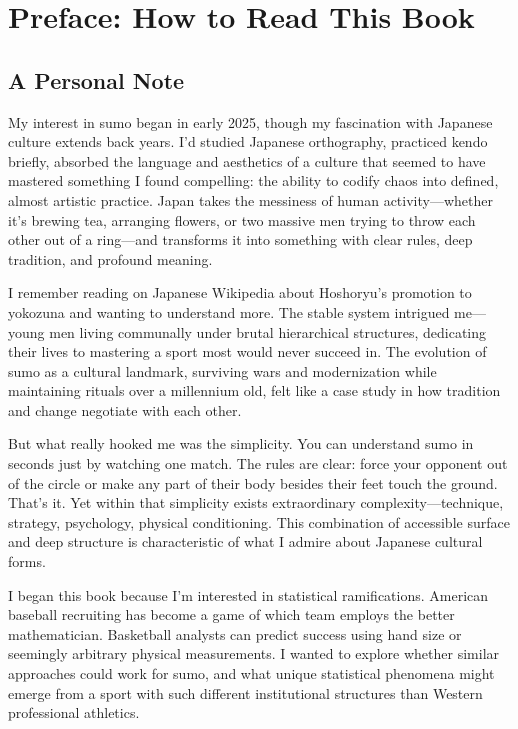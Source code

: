 \chapter*{Preface: How to Read This Book}

\section*{A Personal Note}

My interest in sumo began in early 2025, though my fascination with Japanese culture extends back years. I'd studied Japanese orthography, practiced kendo briefly, absorbed the language and aesthetics of a culture that seemed to have mastered something I found compelling: the ability to codify chaos into defined, almost artistic practice. Japan takes the messiness of human activity—whether it's brewing tea, arranging flowers, or two massive men trying to throw each other out of a ring—and transforms it into something with clear rules, deep tradition, and profound meaning.

I remember reading on Japanese Wikipedia about Hoshoryu's promotion to yokozuna and wanting to understand more. The stable system intrigued me—young men living communally under brutal hierarchical structures, dedicating their lives to mastering a sport most would never succeed in. The evolution of sumo as a cultural landmark, surviving wars and modernization while maintaining rituals over a millennium old, felt like a case study in how tradition and change negotiate with each other.

But what really hooked me was the simplicity. You can understand sumo in seconds just by watching one match. The rules are clear: force your opponent out of the circle or make any part of their body besides their feet touch the ground. That's it. Yet within that simplicity exists extraordinary complexity—technique, strategy, psychology, physical conditioning. This combination of accessible surface and deep structure is characteristic of what I admire about Japanese cultural forms.

I began this book because I'm interested in statistical ramifications. American baseball recruiting has become a game of which team employs the better mathematician. Basketball analysts can predict success using hand size or seemingly arbitrary physical measurements. I wanted to explore whether similar approaches could work for sumo, and what unique statistical phenomena might emerge from a sport with such different institutional structures than Western professional athletics.

